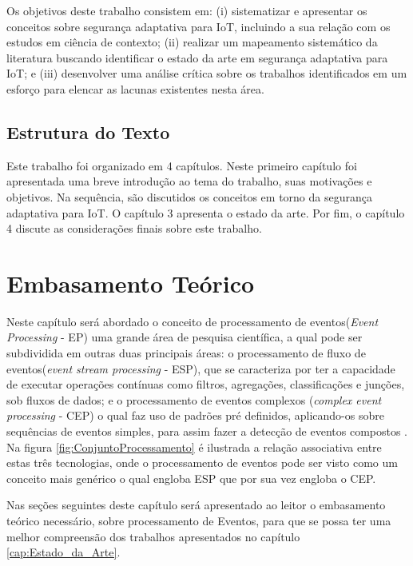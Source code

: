 \documentclass[tid,table]{texufpel} %
\begin{document}
Os objetivos deste trabalho consistem em: (i) sistematizar e apresentar os conceitos sobre segurança adaptativa para IoT, incluindo a sua relação com os estudos em ciência de contexto; (ii) realizar um mapeamento sistemático da literatura buscando identificar o estado da arte em segurança adaptativa para IoT; e (iii) desenvolver uma análise crítica sobre os trabalhos identificados em um esforço para elencar as lacunas existentes nesta área.


\section{Estrutura do Texto}

Este trabalho foi organizado em 4 capítulos. Neste primeiro capítulo foi apresentada uma breve introdução ao tema do trabalho, suas motivações e objetivos. Na sequência, são discutidos os conceitos em torno da segurança adaptativa para IoT. O capítulo 3 apresenta o estado da arte. Por fim, o capítulo 4 discute as considerações finais sobre este trabalho.



\chapter{Embasamento Teórico}
Neste capítulo será abordado o conceito de processamento de eventos(\textit{Event Processing} - EP) uma grande área de pesquisa científica, a qual pode ser subdividida em outras duas principais áreas: o processamento de fluxo de eventos(\textit{event stream processing} - ESP), que se caracteriza por ter a capacidade de executar operações contínuas como filtros, agregações, classificações e junções, sob fluxos de dados; e o processamento de eventos complexos (\textit{complex event processing} - CEP) o qual faz uso de padrões pré definidos, aplicando-os sobre sequências de eventos simples, para assim fazer a detecção de eventos compostos \cite{dayarathna2018recent}. Na figura \ref{fig:ConjuntoProcessamento} é ilustrada a relação associativa entre estas três tecnologias, onde o processamento de eventos pode ser visto como um conceito mais genérico o qual engloba ESP que por sua vez engloba o CEP.

Nas seções seguintes deste capítulo será apresentado ao leitor o embasamento teórico necessário, sobre processamento de Eventos, para que se possa ter uma melhor compreensão dos trabalhos apresentados no capítulo \ref{cap:Estado_da_Arte}.
\end{document}
